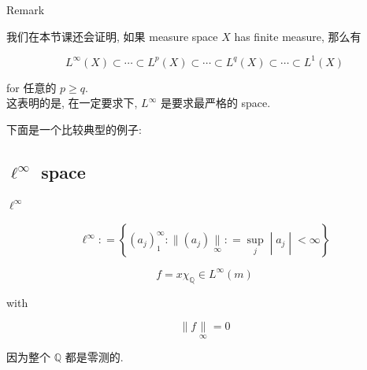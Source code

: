 \documentclass{qlnotes-export}
\begin{document}
\begin{qlremark}{Remark}

我们在本节课还会证明, 如果 measure space \(X\) has finite measure, 那么有

\[L^{\infty}(X) \subset \cdots \subset L^{p}(X) \subset \cdots \subset L^{q}(X) \subset \cdots \subset L^{1}(X)\]

for 任意的 \(p \geq q\).\\
这表明的是, 在一定要求下, \(L^{\infty}\) 是要求最严格的 space.

\end{qlremark}

下面是一个比较典型的例子:

\subsection{\texorpdfstring{\(\ell^{\infty}\) space}{\textbackslash ell\^{}\{\textbackslash infty\} space}}\label{ellinfty-space}

\begin{definition}{\(\ell^{\infty}\)}\label{def-09-l-p-space-and-inequalities-ell-infty}

\[\ell^{\infty}: = \left\{ (a_{j})_{1}^{\infty}: \parallel (a_{j})\underset{\infty}{\parallel}: = \sup\limits_{j} \middle| a_{j} \middle| < \infty \right\}\]

\end{definition}

\begin{example}\label{ex-09-l-p-space-and-inequalities-example-003}

\[f = x\chi_{\mathbb{Q}} \in L^{\infty}(m)\]

with

\[\parallel f\underset{\infty}{\parallel} = 0\]

因为整个 \(\mathbb{Q}\) 都是零测的.

\end{example}
\end{document}
